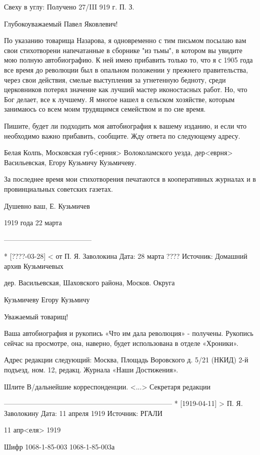 \documentclass[]{memoir}
\begin{document}
Свеху в углу: Получено 27/III 919 г. П. З.

Глубокоуважаемый Павел Яковлевич!

По указанию товарища Назарова, я одновременно с тим письмом посылаю вам свои стихотворени напечатанные в сборнике "из тьмы", в котором вы увидите мою полную автобиографию. К ней имею прибавить только то, что я с 1905 года все время до революции был в опальном положении у прежнего правительства, через свои действия, смелые выступления за угнетенную бедноту, среди церковников потерял значение как лучший мастер иконостасных работ. Но, что Бог делает, все к лучшему. Я многое нашел в сельском хозяйстве, которым занимаюсь со всем моим трудящимся семейством и по сие время.

Пишите, будет ли подходить моя автобиография к вашему изданию, и если что необходимо важно прибавить, сообщите. Жду ответа по следующему адресу.

Белая Колпь, Московская губ<ерния> Волоколамского уезда, дер<еврня> Васильевская, Егору Кузьмичу Кузьмичеву.

За последнее время мои стихотворения печатаются в кооперативных журналах и в провинциальных советских газетах.

Душевно ваш, Е. Кузьмичев

1919 года 22 марта

--------------------------------------

* [????-03-28] < от П. Я. Заволокина 
Дата: 28 марта ????
Источник: Домашний архив Кузьмичевых

дер. Васильевская, Шаховского района, Москов. Округа

Кузьмичеву Егору Кузьмичу

Уважаемый товарищ!

Ваша автобиография и рукопись «Что им дала революция» - получены. Рукопись сейчас на просмотре, она, наверно, будет использована в отделе «Хроники».

Адрес редакции следующий: Москва, Площадь Воровского д. 5/21 (НКИД) 2-й подъезд, ном. 12, редакц. Журнала «Наши Достижения».

Шлите В/дальнейшие корреспонденции.
<...> Секретаря редакции 

------------------------------------------------------------------------
* [1919-04-11] > П. Я. Заволокину 
Дата: 11 апреля 1919
Источник: РГАЛИ

11 апр<еля> 1919

Шифр    1068-1-85-003
        1068-1-85-003а
\end{document}
